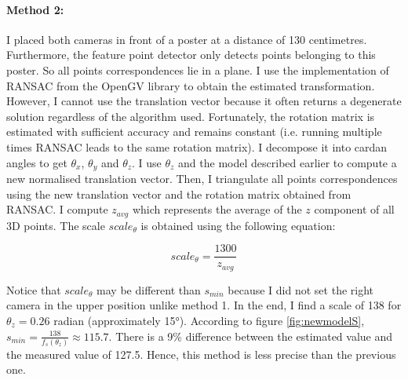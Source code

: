 \documentclass[11pt]{report}
\begin{document}
\paragraph{Method 2:} I placed both cameras in front of a poster at a distance of 130 centimetres. Furthermore, the feature point detector only detects points belonging to this poster. So all points correspondences lie in a plane. I use the implementation of RANSAC from the OpenGV library to obtain the estimated transformation. However, I cannot use the translation vector because it often returns a degenerate solution regardless of the algorithm used. Fortunately, the rotation matrix is estimated with sufficient accuracy and remains constant (i.e. running multiple times RANSAC leads to the same rotation matrix). I decompose it into cardan angles to get $\theta_x$, $\theta_y$ and $\theta_z$. I use $\theta_z$ and the model described earlier to compute a new normalised translation vector. Then, I triangulate all points correspondences using the new translation vector and the rotation matrix obtained from RANSAC. I compute $z_{avg}$ which represents the average of the $z$ component of all 3D points. The scale $scale_\theta$ is obtained using the following equation:

\begin{equation}
  scale_\theta = \frac{1300}{z_{avg}}
\end{equation}

Notice that $scale_\theta$ may be different than $s_{min}$ because I did not set the right camera in the upper position unlike method 1. In the end, I find a scale of 138 for $\theta_z = 0.26$ radian (approximately \ang{15}). According to figure \ref{fig:newmodelS}, $s_{min} = \frac{138}{f_s(\theta_z)} \approx 115.7$. There is a 9\% difference between the estimated value and the measured value of 127.5. Hence, this method is less precise than the previous one.
\end{document}
